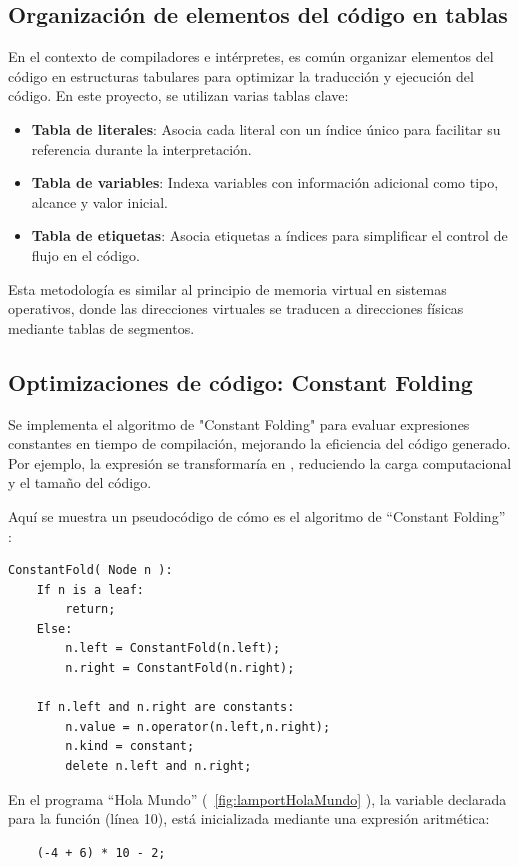 \subsection{Organización de elementos del código en tablas}
En el contexto de compiladores e intérpretes, es común organizar elementos del código en estructuras tabulares para optimizar la traducción y ejecución del código. En este proyecto, se utilizan varias tablas clave:

\begin{itemize}
    \item \textbf{Tabla de literales}: Asocia cada literal con un índice único para facilitar su referencia durante la interpretación.
    \item \textbf{Tabla de variables}: Indexa variables con información adicional como tipo, alcance y valor inicial.
    \item \textbf{Tabla de etiquetas}: Asocia etiquetas a índices para simplificar el control de flujo en el código.
\end{itemize}

Esta metodología es similar al principio de memoria virtual en sistemas operativos, donde las direcciones virtuales se traducen a direcciones físicas mediante tablas de segmentos.

\subsection{Optimizaciones de código: Constant Folding}
Se implementa el algoritmo de "Constant Folding" para evaluar expresiones constantes en tiempo de compilación, mejorando la eficiencia del código generado. Por ejemplo, la expresión  se transformaría en , reduciendo la carga computacional y el tamaño del código.

\noindent
Aquí se muestra un pseudocódigo de cómo es el algoritmo de ``Constant Folding'' \cite[Capítulo 8]{thain2020introduction}:
\begin{verbatim}
ConstantFold( Node n ):
    If n is a leaf:
        return;
    Else:
        n.left = ConstantFold(n.left);
        n.right = ConstantFold(n.right);
    
    If n.left and n.right are constants:
        n.value = n.operator(n.left,n.right);
        n.kind = constant;
        delete n.left and n.right;
\end{verbatim}

En el programa ``Hola Mundo'' (~\ref{fig:lamportHolaMundo} ), la variable  declarada para la función  (línea 10), está inicializada mediante una expresión aritmética: 
\begin{verbatim}
    (-4 + 6) * 10 - 2;
\end{verbatim}

